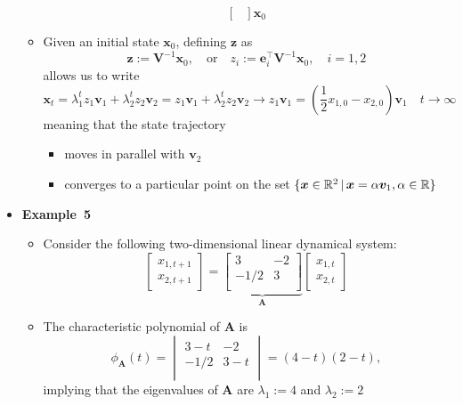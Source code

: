 \documentclass[12pt,a4paper]{article}
\begin{document}
\begin{itemize}
\begin{itemize}
\begin{equation}
\begin{bmatrix}
      \end{bmatrix}
      \bm{x}_{0}
      \end{equation}
    \item Given an initial state $\bm{x}_{0}$,
      defining $\bm{z}$ as
      \begin{equation}\nonumber%
        \bm{z} := \bm{V}^{-1}\bm{x}_{0},
        \quad\text{or}\quad
        z_{i} := \bm{e}_{i}^{\top}\bm{V}^{-1}\bm{x}_{0},
        \quad i = 1, 2
      \end{equation}
      allows us to write
    \begin{equation}\nonumber%
      \bm{x}_{t}
      =
      \lambda_{1}^{t}z_{1}\bm{v}_{1}
      +
      \lambda_{2}^{t}z_{2}\bm{v}_{2}
      =
      z_{1}\bm{v}_{1}
      +
      \lambda_{2}^{t}z_{2}\bm{v}_{2}
      \to
      z_{1}\bm{v}_{1}
      =
      \left(\frac{1}{2}x_{1,0} - x_{2,0}\right)\bm{v}_{1}
      \quad t \to \infty
    \end{equation}
    meaning that the state trajectory
    \begin{itemize}
    \item moves in parallel with $\bm{v}_{2}$
    \item converges to a particular point on the set $\{\bm{x}\in \mathbb{R}^{2}\,|\, \bm{x}=\alpha \bm{v}_{1}, \alpha \in \mathbb{R}\}$
    \end{itemize}
    
  \end{itemize}

\clearpage
\item \textbf{Example~5}
  \begin{itemize}
  \item Consider the following two-dimensional linear dynamical system:
    \begin{equation}\nonumber%
      \begin{bmatrix}
        x_{1,t+1} \\
        x_{2,t+1}
      \end{bmatrix}
      =
      \underbrace{
      \begin{bmatrix}
        3 & -2 \\
        -1/2 & 3 \\
      \end{bmatrix}}_{\bm{A}}
      \begin{bmatrix}
        x_{1,t} \\
        x_{2,t}
      \end{bmatrix}
    \end{equation}
  \item The characteristic polynomial of $\bm{A}$ is
    \begin{equation}\nonumber%
      \phi_{\bm{A}}(t) = 
      \begin{vmatrix}
        3 - t & -2 \\
        -1/2 & 3 - t \\
      \end{vmatrix}
      = (4-t)(2-t),
    \end{equation}
    implying that
    the eigenvalues of $\bm{A}$ are $\lambda_{1}:=4$ and $\lambda_{2}:=2$


\end{itemize}
\end{itemize}
\end{document}
